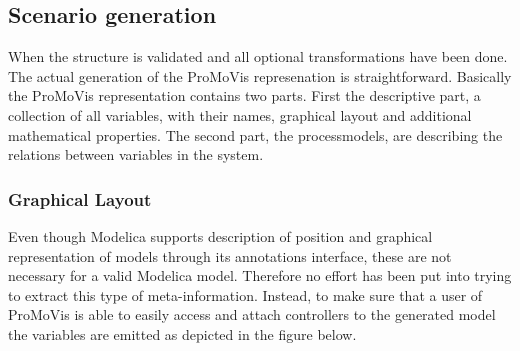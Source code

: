\subsection{Scenario generation}
When the structure is validated and all optional transformations have been done. The actual generation of the ProMoVis represenation is straightforward. Basically the ProMoVis representation contains two parts. First the descriptive part, a collection of all variables, with their names, graphical layout and additional mathematical properties. The second part, the processmodels, are describing the relations between variables in the system. 
\subsubsection{Graphical Layout}
Even though Modelica supports description of position and graphical representation of models through its annotations interface, these are not necessary for a valid Modelica model. Therefore no effort has been put into trying to extract this type of meta-information. Instead, to make sure that a user of ProMoVis is able to easily access and attach controllers to the generated model the variables are emitted as depicted in the figure below.\\\newline
\setlength\fboxsep{0pt}
\setlength\fboxrule{0.5pt}
\\\newline

